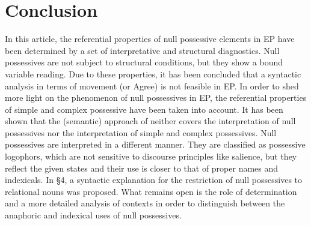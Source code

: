 \documentclass[output=paper]{langsci/langscibook}
\begin{document}
\section{Conclusion}%
In this article, the referential properties of null possessive elements in EP have been determined by a set of interpretative and structural diagnostics. Null possessives are not subject to structural conditions, but they show a bound variable reading. Due to these properties, it has been concluded that a syntactic analysis in terms of movement (or Agree) is not feasible in EP. In order to shed more light on the phenomenon of null possessives in EP, the referential properties of simple and complex possessive have been taken into account. It has been shown that the (semantic) approach of \citet{Reinhart2006} neither covers the interpretation of null possessives nor the interpretation of simple and complex possessives. Null possessives are interpreted in a different manner. They are classified as possessive logophors, which are not sensitive to discourse principles like salience, but they reflect the given states and their use is closer to that of proper names and indexicals. In §4, a syntactic explanation for the restriction of null possessives to relational nouns was proposed. What remains open is the role of determination and a more detailed analysis of contexts in order to distinguish between the anaphoric and indexical uses of null possessives.
\end{document}
